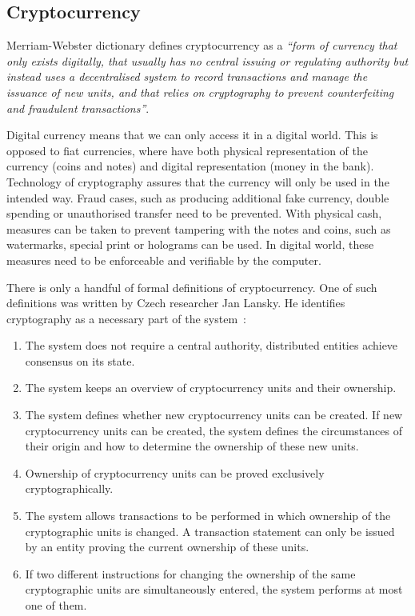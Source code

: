 \subsection{Cryptocurrency}
% 
Merriam-Webster dictionary defines cryptocurrency as a \textit{``form of currency that only exists digitally, that usually has no central issuing or regulating authority but instead uses a decentralised system to record transactions and manage the issuance of new units, and that relies on cryptography to prevent counterfeiting and fraudulent transactions''}\footnotemark.
% 

Digital currency means that we can only access it in a digital world. This is opposed to fiat currencies, where have both physical representation of the currency (coins and notes) and digital representation (money in the bank). Technology of cryptography assures that the currency will only be used in the intended way. Fraud cases, such as producing additional fake currency, double spending or unauthorised transfer need to be prevented. With physical cash, measures can be taken to prevent tampering with the notes and coins, such as watermarks, special print or holograms can be used. In digital world, these measures need to be enforceable and verifiable by the computer.

There is only a handful of formal definitions of cryptocurrency. One of such definitions was written by Czech researcher Jan Lansky. He identifies cryptography as a necessary part of the system~\cite{Lansky2018PossibleCryptocurrencies}:
\begin{enumerate}[noitemsep]
    \item The system does not require a central authority, distributed entities achieve consensus on its state.
    \item The system keeps an overview of cryptocurrency units and their ownership.
    \item The system defines whether new cryptocurrency units can be created. If new cryptocurrency units can  be  created,  the  system  defines  the  circumstances  of  their  origin  and  how  to  determine  the ownership of these new units.
    \item Ownership of cryptocurrency units can be proved exclusively cryptographically.
    \item The system allows transactions to be performed in  which ownership of the cryptographic units is changed. A transaction statement can only be issued by an entity proving the current ownership of these units.
    \item If  two  different  instructions  for  changing  the  ownership  of the  same  cryptographic  units  are simultaneously entered, the system performs at most one of them.
\end{enumerate}

